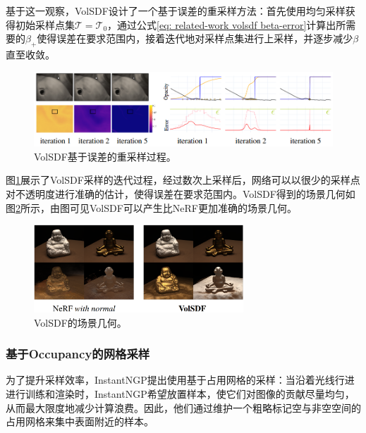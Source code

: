 基于这一观察，VolSDF设计了一个基于误差的重采样方法：首先使用均匀采样获得初始采样点集$\mathcal{T}=\mathcal{T}_0$，通过公式\ref{eq: related-work volsdf beta-error}计算出所需要的$\beta_+$使得误差在要求范围内，接着迭代地对采样点集进行上采样，并逐步减少$\beta$直至收敛。

\begin{figure}[ht]
    \centering
    \includegraphics[width=\textwidth]{undergraduate-thesis/images/volsdf-sampling.png}
    \caption{VolSDF\cite{yariv_volume_2021}基于误差的重采样过程。}
    \label{fig:related-work volsdf-sampling}
\end{figure}

图\ref{fig:related-work volsdf-sampling}展示了VolSDF采样的迭代过程，经过数次上采样后，网络可以以很少的采样点对不透明度进行准确的估计，使得误差在要求范围内。VolSDF得到的场景几何如图\ref{fig:related-work volsdf-result}所示，由图可见VolSDF可以产生比NeRF更加准确的场景几何。

\begin{figure}[ht]
    \centering
    \includegraphics[width=0.7\textwidth]{undergraduate-thesis/images/volsdf-result.png}
    \caption{VolSDF\cite{yariv_volume_2021}的场景几何。}
    \label{fig:related-work volsdf-result}
\end{figure}



\subsubsection{基于Occupancy的网格采样}
为了提升采样效率，InstantNGP\cite{muller_instant_2022}提出使用基于占用网格的采样：当沿着光线行进进行训练和渲染时，InstantNGP希望放置样本，使它们对图像的贡献尽量均匀，从而最大限度地减少计算浪费。因此，他们通过维护一个粗略标记空与非空空间的占用网格来集中表面附近的样本。

